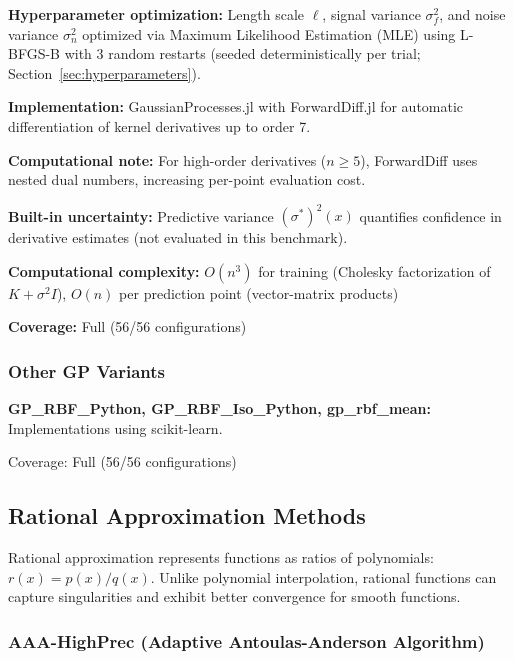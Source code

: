 \textbf{Hyperparameter optimization:} Length scale $\ell$, signal variance $\sigma^2_f$, and noise variance $\sigma^2_n$ optimized via Maximum Likelihood Estimation (MLE) using L-BFGS-B with 3 random restarts (seeded deterministically per trial; Section~\ref{sec:hyperparameters}).

\textbf{Implementation:} GaussianProcesses.jl with ForwardDiff.jl for automatic differentiation of kernel derivatives up to order 7.

\textbf{Computational note:} For high-order derivatives ($n \geq 5$), ForwardDiff uses nested dual numbers, increasing per-point evaluation cost. 

\textbf{Built-in uncertainty:} Predictive variance $(\sigma^*)^2(x)$ quantifies confidence in derivative estimates (not evaluated in this benchmark).

\textbf{Computational complexity:} $O(n^3)$ for training (Cholesky factorization of $K + \sigma^2I$), $O(n)$ per prediction point (vector-matrix products)

\textbf{Coverage:} Full (56/56 configurations)

\subsubsection{Other GP Variants}

\textbf{GP\_RBF\_Python, GP\_RBF\_Iso\_Python, gp\_rbf\_mean:} Implementations using scikit-learn. 

Coverage: Full (56/56 configurations)

\subsection{Rational Approximation Methods}
\label{sec:rational_methods}

Rational approximation represents functions as ratios of polynomials: $r(x) = p(x)/q(x)$. Unlike polynomial interpolation, rational functions can capture singularities and exhibit better convergence for smooth functions.

\subsubsection{AAA-HighPrec (Adaptive Antoulas-Anderson Algorithm)}

